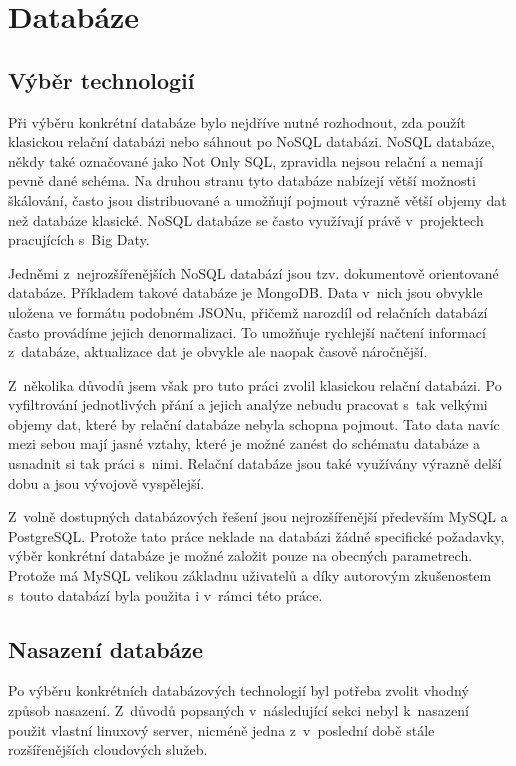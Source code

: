 \documentclass[thesis=B,czech]{FITthesis}[2012/06/26]
\begin{document}
\section{Databáze}
\subsection{Výběr technologií}
	Při výběru konkrétní databáze bylo nejdříve nutné rozhodnout, zda použít klasickou relační databázi nebo sáhnout po NoSQL databázi. NoSQL databáze, někdy také označované jako Not Only SQL, zpravidla nejsou relační a nemají pevně dané schéma. Na druhou stranu tyto databáze nabízejí větší možnosti škálování, často jsou distribuované a umožňují pojmout výrazně větší objemy dat než databáze klasické\cite{nosql-dbs}. NoSQL databáze se často využívají právě v~projektech pracujících s~Big Daty. 
	
	Jedněmi z~nejrozšířenějších NoSQL databází jsou tzv. dokumentově orientované databáze. Příkladem takové databáze je MongoDB\cite{mongo}. Data v~nich jsou obvykle uložena ve formátu podobném JSONu, přičemž narozdíl od relačních databází často provádíme jejich denormalizaci. To umožňuje rychlejší načtení informací z~databáze, aktualizace dat je obvykle ale naopak časově náročnější\cite{nosql-speed}. 
	
	Z~několika důvodů jsem však pro tuto práci zvolil klasickou relační databázi. Po vyfiltrování jednotlivých přání a jejich analýze nebudu pracovat s~tak velkými objemy dat, které by relační databáze nebyla schopna pojmout. Tato data navíc mezi sebou mají jasné vztahy, které je možné zanést do schématu databáze a usnadnit si tak práci s~nimi. Relační databáze jsou také využívány výrazně delší dobu a jsou vývojově vyspělejší. 
	
	Z~volně dostupných databázových řešení jsou nejrozšířenější především MySQL a PostgreSQL. Protože tato práce neklade na databázi žádné specifické požadavky, výběr konkrétní databáze je možné založit pouze na obecných parametrech. Protože má MySQL velikou základnu uživatelů a díky autorovým zkušenostem s~touto databází byla použita i v~rámci této práce. 
	
\subsection{Nasazení databáze}
	Po výběru konkrétních databázových technologií byl potřeba zvolit vhodný způsob nasazení. Z~důvodů popsaných v~následující sekci nebyl k~nasazení použit vlastní linuxový server, nicméně jedna z~v~poslední době stále rozšířenějších cloudových služeb. 
	
\end{document}
